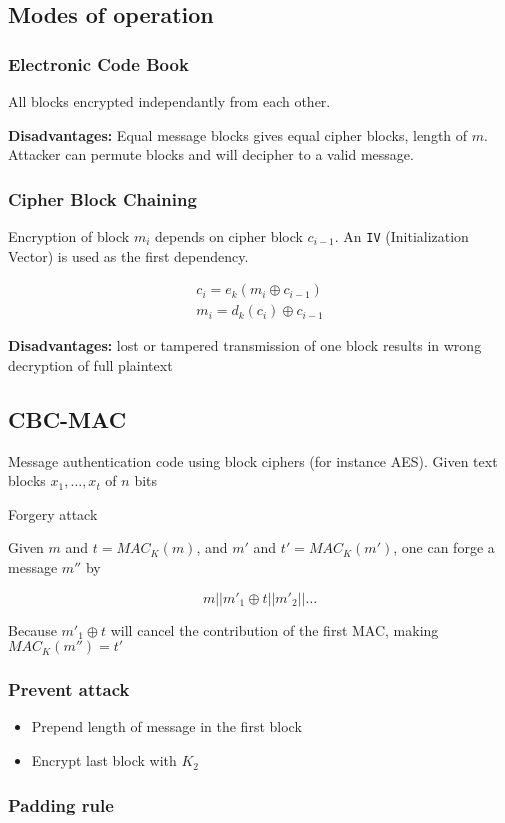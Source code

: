 \subsection{Modes of operation}

\subsubsection*{Electronic Code Book}

All blocks encrypted independantly from each other.

\textbf{Disadvantages:} Equal message blocks gives equal cipher
blocks, length of $m$. Attacker can permute blocks and will decipher
to a valid message.

\subsubsection*{Cipher Block Chaining}

Encryption of block $m_i$ depends on cipher block $c_{i-1}$. An
\texttt{IV} (Initialization Vector) is used as the first dependency.

\begin{align*}
  c_i = e_k(m_i \oplus c_{i - 1})\\
  m_i = d_k(c_i) \oplus c_{i-1}
\end{align*}

\textbf{Disadvantages:} lost or tampered transmission of one block
results in wrong decryption of full plaintext

\subsection{CBC-MAC}

Message authentication code using block ciphers (for instance
AES). Given text blocks $x_1, \ldots, x_t$ of $n$ bits

Forgery attack

Given $m$ and $t = MAC_K(m)$, and $m'$ and $t' = MAC_K(m')$, one can forge a message $m''$ by

\[ m || m'_1 \oplus t || m'_2 || \ldots \]

Because $m'_1 \oplus t$ will cancel the contribution of the first MAC, making $MAC_K(m'') = t'$

\subsubsection{Prevent attack}
\begin{itemize}
\item Prepend length of message in the first block
\item Encrypt last block with $K_2$
\end{itemize}

\subsubsection{Padding rule}
